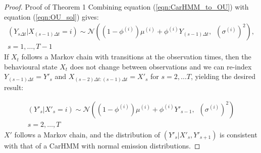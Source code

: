 \begin{proof}{Proof of Theorem 1}{}
Combining equation (\ref{eqn:CarHMM_to_OU}) with equation (\ref{eqn:OU_sol}) gives:
%
\begin{align*}
\left(Y_{s \Delta t} | X_{(s-1)\Delta t} = i \right) \sim \mathcal{N}\left((1-\phi^{(i)}) \mu^{(i)} + \phi^{(i)} Y_{(s-1) \Delta t}, \enspace \left(\sigma^{(i)}\right)^2 \right),\\
s = 1, \ldots, T-1
\end{align*}
%
If $X_t$ follows a Markov chain with transitions at the observation times, then the behavioural state $X_t$ does not change between observations and we can re-index $Y_{(s-1) \Delta t} = Y'_s$ and $X_{(s-2)\Delta t: (s-1) \Delta t} = X'_s$ for $s = 2,\ldots T$, yielding the desired result:

\begin{align*}
\left(Y'_s| X'_s = i \right) \sim \mathcal{N}\left((1-\phi^{(i)}) \mu^{(i)} + \phi^{(i)} Y'_{s-1}, \enspace \left(\sigma^{(i)}\right)^2 \right)\\
s = 2, \ldots, T
\end{align*}
%
$X'$ follows a Markov chain, and the distribution of $(Y'_s|X'_s,Y'_{s+1})$ is consistent with that of a CarHMM with normal emission distributions.
\end{proof}


